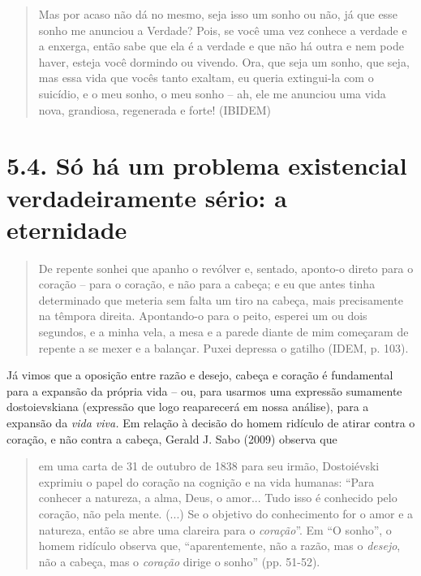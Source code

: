 \begin{quote}
Mas por acaso não dá no mesmo, seja isso um sonho ou não, já que esse
sonho me anunciou a Verdade? Pois, se você uma vez conhece a verdade e a
enxerga, então sabe que ela é a verdade e que não há outra e nem pode
haver, esteja você dormindo ou vivendo. Ora, que seja um sonho, que
seja, mas essa vida que vocês tanto exaltam, eu queria extingui-la com o
suicídio, e o meu sonho, o meu sonho -- ah, ele me anunciou uma vida
nova, grandiosa, regenerada e forte! (IBIDEM)
\end{quote}

\section{5.4. Só há um problema existencial verdadeiramente sério: a
eternidade }

\begin{quote}
De repente sonhei que apanho o revólver e, sentado, aponto-o direto para
o coração -- para o coração, e não para a cabeça; e eu que antes tinha
determinado que meteria sem falta um tiro na cabeça, mais precisamente
na têmpora direita. Apontando-o para o peito, esperei um ou dois
segundos, e a minha vela, a mesa e a parede diante de mim começaram de
repente a se mexer e a balançar. Puxei depressa o gatilho (IDEM, p.
103).
\end{quote}

Já vimos que a oposição entre razão e desejo, cabeça e coração é
fundamental para a expansão da própria vida -- ou, para usarmos uma
expressão sumamente dostoievskiana (expressão que logo reaparecerá em
nossa análise), para a expansão da \emph{vida viva.} Em relação à
decisão do homem ridículo de atirar contra o coração, e não contra a
cabeça, Gerald J. Sabo (2009) observa que

\begin{quote}
em uma carta de 31 de outubro de 1838 para seu irmão, Dostoiévski
exprimiu o papel do coração na cognição e na vida humanas: ``Para
conhecer a natureza, a alma, Deus, o amor... Tudo isso é conhecido pelo
coração, não pela mente. (...) Se o objetivo do conhecimento for o amor
e a natureza, então se abre uma clareira para o \emph{coração}''. Em ``O
sonho'', o homem ridículo observa que, ``aparentemente, não a razão, mas
o \emph{desejo}, não a cabeça, mas o \emph{coração} dirige o sonho''
(pp. 51-52).
\end{quote}

